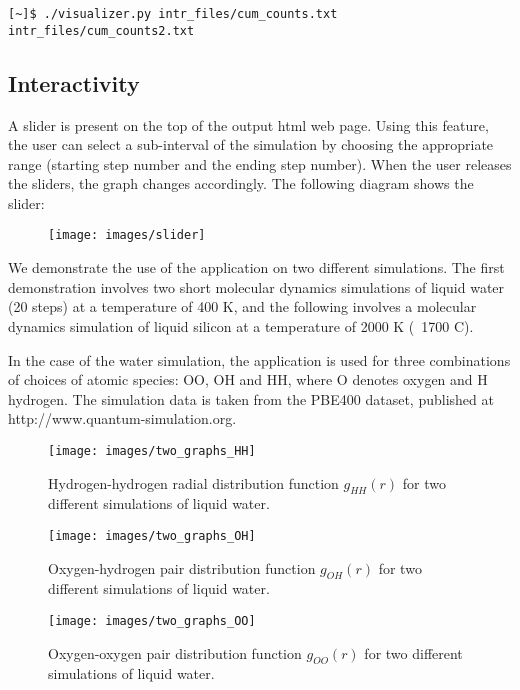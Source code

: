 \begin{verbatim}
[~]$ ./visualizer.py intr_files/cum_counts.txt intr_files/cum_counts2.txt 
\end{verbatim}


\subsection*{Interactivity}

A slider is present on the top of the output html web page. Using this feature, the user can select a sub-interval of the simulation by choosing the appropriate range (starting step number and the ending step number). When the user releases the sliders, the graph changes accordingly. The following diagram shows the slider:

\begin{figure}[H]
\centering
\texttt{[image: images/slider]}
\end{figure}

We demonstrate the use of the application on two different simulations. The first demonstration involves two short molecular dynamics simulations of liquid water (20 steps) at a temperature of 400 K, and the following involves a molecular dynamics simulation of liquid silicon at a temperature of 2000 K (~1700 C). 

In the case of the water simulation, the application is used for three combinations of choices of atomic species: OO, OH and HH, where O denotes oxygen and H hydrogen. The simulation data is taken from the PBE400 dataset, published at http://www.quantum-simulation.org. 

\begin{figure}[H]
\centering
\texttt{[image: images/two\_graphs\_HH]}
\caption{Hydrogen-hydrogen radial distribution function $g_{HH}(r)$ for two different simulations of liquid water.}
\end{figure}

\begin{figure}[H]
\centering
\texttt{[image: images/two\_graphs\_OH]}
\caption{Oxygen-hydrogen pair distribution function $g_{OH}(r)$ for two different simulations of liquid water.}
\end{figure}

\begin{figure}[H]
\centering
\texttt{[image: images/two\_graphs\_OO]}
\caption{Oxygen-oxygen pair distribution function $g_{OO}(r)$ for two different simulations of liquid water.}
\end{figure}

